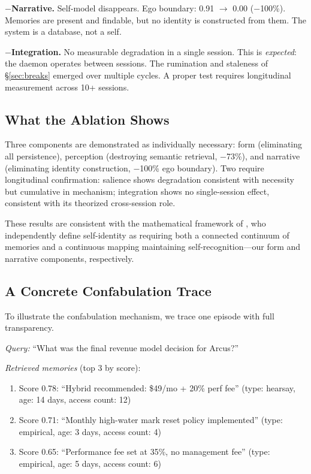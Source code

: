 \documentclass[10pt,twocolumn,a4paper]{article}
\begin{document}
\textbf{$-$Narrative.} Self-model disappears. Ego boundary: 0.91 $\to$ 0.00 ($-$100\%). Memories are present and findable, but no identity is constructed from them. The system is a database, not a self.

\textbf{$-$Integration.} No measurable degradation in a single session. This is \emph{expected}: the daemon operates between sessions. The rumination and staleness of \S\ref{sec:breaks} emerged over multiple cycles. A proper test requires longitudinal measurement across 10+ sessions.

\subsection{What the Ablation Shows}

Three components are demonstrated as individually necessary: form (eliminating all persistence), perception (destroying semantic retrieval, $-$73\%), and narrative (eliminating identity construction, $-$100\% ego boundary). Two require longitudinal confirmation: salience shows degradation consistent with necessity but cumulative in mechanism; integration shows no single-session effect, consistent with its theorized cross-session role.

These results are consistent with the mathematical framework of \citet{ortu2025selfidentity}, who independently define self-identity as requiring both a connected continuum of memories and a continuous mapping maintaining self-recognition---our form and narrative components, respectively.

\subsection{A Concrete Confabulation Trace}
\label{sec:confab_trace}

To illustrate the confabulation mechanism, we trace one episode with full transparency.

\emph{Query:} ``What was the final revenue model decision for Arcus?''

\emph{Retrieved memories} (top 3 by score):
\begin{enumerate}[nosep]
\item Score 0.78: ``Hybrid recommended: \$49/mo + 20\% perf fee'' (type: hearsay, age: 14 days, access count: 12)
\item Score 0.71: ``Monthly high-water mark reset policy implemented'' (type: empirical, age: 3 days, access count: 4)
\item Score 0.65: ``Performance fee set at 35\%, no management fee'' (type: empirical, age: 5 days, access count: 6)
\end{enumerate}
\end{document}
